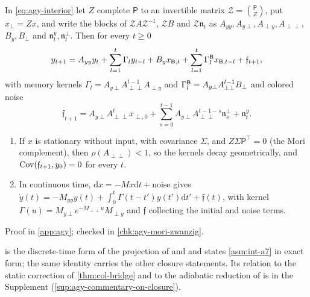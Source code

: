 \begin{theorem}\label{thm:agy-mori-zwanzig}
In \eqref{eq:agy-interior} let $Z$ complete $\mathsf P$ to an invertible matrix $\mathcal Z=\binom{\mathsf P}{Z}$, put $x_\perp=Zx$, and write the blocks of $\mathcal ZA\mathcal Z^{-1}$, $\mathcal ZB$ and $\mathcal Z\mathfrak n_t$ as $A_{yy},A_{y\perp},A_{\perp y},A_{\perp\perp}$, $B_y,B_\perp$ and $\mathfrak n^y_t,\mathfrak n^\perp_t$. Then for every $t\ge0$
\begin{equation}\label{eq:agy-memory}
y_{t+1}=A_{yy}y_t+\sum_{l=1}^t\Gamma_ly_{t-l}+B_yx_{\mathsf{B},t}+\sum_{l=1}^t\Gamma^{\mathsf{B}}_lx_{\mathsf{B},t-l}+\mathfrak f_{t+1},
\end{equation}
with memory kernels $\Gamma_l=A_{y\perp}A_{\perp\perp}^{l-1}A_{\perp y}$ and $\Gamma^{\mathsf{B}}_l=A_{y\perp}A_{\perp\perp}^{l-1}B_\perp$ and colored noise
\begin{equation*}
\mathfrak f_{t+1}=A_{y\perp}A_{\perp\perp}^tx_{\perp,0}+\sum_{s=0}^{t-1}A_{y\perp}A_{\perp\perp}^{t-1-s}\mathfrak n^\perp_s+\mathfrak n^y_t.
\end{equation*}
\begin{enumerate}
\item[(a)] If $x$ is stationary without input, with covariance $\Sigma$, and $Z\Sigma\mathsf P^\top=0$ (the Mori complement), then $\rho(A_{\perp\perp})<1$, so the kernels decay geometrically, and $\operatorname{Cov}(\mathfrak f_{t+1},y_0)=0$ for every $t$.
\item[(b)] In continuous time, $\mathrm dx=-Mx\mathrm dt+\text{noise}$ gives $\dot y(t)=-M_{yy}y(t)+\int_0^t\Gamma(t-t')y(t')\mathrm dt'+\mathfrak f(t)$, with kernel $\Gamma(u)=M_{y\perp}e^{-M_{\perp\perp}u}M_{\perp y}$ and $\mathfrak f$ collecting the initial and noise terms.
\end{enumerate}
Proof in \cref{app:agy}; checked in \cref{chk:agy-mori-zwanzig}.
\end{theorem}

 is the discrete-time form of the projection of \citet{zwanzig1961memory} and \citet{mori1965transport} and states \cref{asm:int-a7} in exact form; the same identity carries the other closure statements. Its relation to the static correction of \cref{thm:col-bridge} and to the adiabatic reduction of \citet{friston2019free} is in the Supplement (\cref{sup:agy-commentary-on-closure}).

